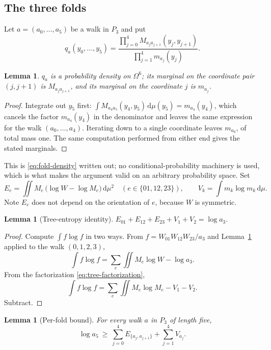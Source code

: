 \documentclass[11pt]{article}
\newtheorem{lemma}[theorem]{Lemma}
\newcommand{\dd}{\,\mathrm d}
\begin{document}
\subsection{The three folds}

Let $a=(a_0,\dots,a_5)$ be a walk in $P_3$ and put
\begin{equation}
 q_a(y_0,\dots,y_5)
 =\frac{\prod_{j=0}^{4}M_{a_ja_{j+1}}(y_j,y_{j+1})}
        {\prod_{j=1}^{4}m_{a_j}(y_j)} .
 \label{eq:fold-density}
\end{equation}

\begin{lemma}
\label{lem:fold}
$q_a$ is a probability density on $\Omega^6$; its marginal on the coordinate
pair $(j,j+1)$ is $M_{a_ja_{j+1}}$, and its marginal on the coordinate $j$ is
$m_{a_j}$.
\end{lemma}

\begin{proof}
Integrate out $y_5$ first: $\int M_{a_4a_5}(y_4,y_5)\dd\mu(y_5)=m_{a_4}(y_4)$,
which cancels the factor $m_{a_4}(y_4)$ in the denominator and leaves the same
expression for the walk $(a_0,\dots,a_4)$.  Iterating down to a single
coordinate leaves $m_{a_0}$, of total mass one.  The same computation performed
from either end gives the stated marginals.
\end{proof}

This is \eqref{eq:fold-density} written out; no conditional-probability
machinery is used, which is what makes the argument valid on an arbitrary
probability space.  Set
\[
 E_e=\iint M_e\,\bigl(\log W-\log M_e\bigr)\dd\mu^2
 \quad(e\in\{01,12,23\}),
 \qquad
 V_k=\int m_k\log m_k\dd\mu .
\]
Note $E_e$ does not depend on the orientation of $e$, because $W$ is symmetric.

\begin{lemma}[Tree-entropy identity]
\label{lem:identity}
$E_{01}+E_{12}+E_{23}+V_1+V_2=\log a_3 .$
\end{lemma}

\begin{proof}
Compute $\int f\log f$ in two ways.  From $f=W_{01}W_{12}W_{23}/a_3$ and
Lemma~\ref{lem:fold} applied to the walk $(0,1,2,3)$,
\[
 \int f\log f
 =\sum_e\iint M_e\log W-\log a_3 .
\]
From the factorization \eqref{eq:tree-factorization},
\[
 \int f\log f=\sum_e\iint M_e\log M_e-V_1-V_2 .
\]
Subtract.
\end{proof}

\begin{lemma}[Per-fold bound]
\label{lem:perfold}
For every walk $a$ in $P_3$ of length five,
\[
 \log a_5\ \geq\ \sum_{j=0}^{4}E_{\{a_j,a_{j+1}\}}+\sum_{j=1}^{4}V_{a_j}.
\]
\end{lemma}
\end{document}
